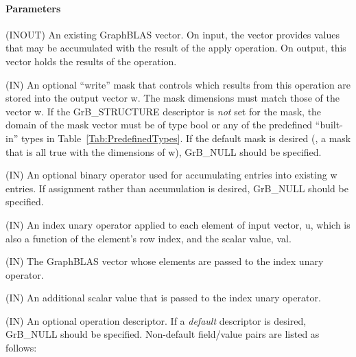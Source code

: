 \paragraph{Parameters}

\begin{itemize}[leftmargin=1.1in]
    \item[{\sf w}]    ({\sf INOUT}) An existing GraphBLAS vector.  On input,
    the vector provides values that may be accumulated with the result of the
    apply operation.  On output, this vector holds the results of the
    operation.

    \item[{\sf mask}] ({\sf IN}) An optional ``write'' mask that controls which
    results from this operation are stored into the output vector {\sf w}. The 
    mask dimensions must match those of the vector {\sf w}. If the 
    {\sf GrB\_STRUCTURE} descriptor is {\em not} set for the mask, the domain of the
    {\sf mask} vector must be of type {\sf bool} or any of the predefined 
    ``built-in'' types in Table~\ref{Tab:PredefinedTypes}.  If the default
    mask is desired (\ie, a mask that is all {\sf true} with the dimensions of {\sf w}), 
    {\sf GrB\_NULL} should be specified.

    \item[{\sf accum}] ({\sf IN}) An optional binary operator used for accumulating
    entries into existing {\sf w} entries. If assignment rather than accumulation is
    desired, {\sf GrB\_NULL} should be specified.

{\color{red}
    \item[{\sf op}] ({\sf IN}) An index unary operator applied to each element of input 
    vector, {\sf u}, which is also a function of the element's row index, 
    and the scalar value, {\sf val}.
}

    \item[{\sf u}] ({\sf IN}) The GraphBLAS vector whose elements are passed 
    to the index unary operator.

    \item[{\sf val}] ({\sf IN}) An additional scalar value that is passed to the 
    index unary operator.
    
    \item[{\sf desc}] ({\sf IN}) An optional operation descriptor. If
    a \emph{default} descriptor is desired, {\sf GrB\_NULL} should be
    specified. Non-default field/value pairs are listed as follows:  \\


\end{itemize}
